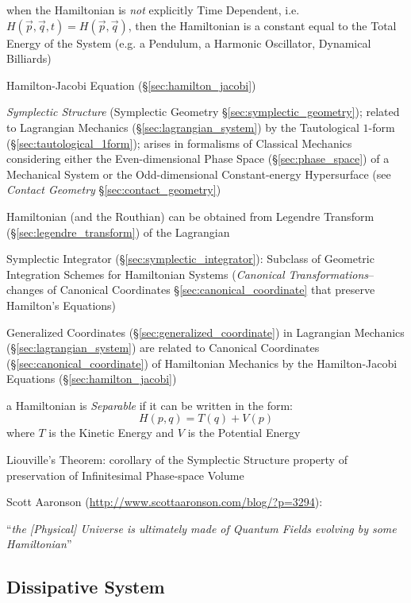 when the Hamiltonian is \emph{not} explicitly Time Dependent, i.e.
$H(\vec{p},\vec{q},t) = H(\vec{p},\vec{q})$, then the Hamiltonian is a
constant equal to the Total Energy of the System (e.g. a Pendulum, a Harmonic
Oscillator, Dynamical Billiards)

\fist Hamilton-Jacobi Equation (\S\ref{sec:hamilton_jacobi})

\emph{Symplectic Structure} (Symplectic Geometry
\S\ref{sec:symplectic_geometry}); related to Lagrangian Mechanics
(\S\ref{sec:lagrangian_system}) by the Tautological $1$-form
(\S\ref{sec:tautological_1form}); arises in formalisms of Classical Mechanics
considering either the Even-dimensional Phase Space (\S\ref{sec:phase_space})
of a Mechanical System or the Odd-dimensional Constant-energy Hypersurface (see
\emph{Contact Geometry} \S\ref{sec:contact_geometry})

Hamiltonian (and the Routhian) can be obtained from Legendre Transform
(\S\ref{sec:legendre_transform}) of the Lagrangian

\fist Symplectic Integrator (\S\ref{sec:symplectic_integrator}): Subclass of
Geometric Integration Schemes for Hamiltonian Systems (\emph{Canonical
  Transformations}-- changes of Canonical Coordinates
\S\ref{sec:canonical_coordinate} that preserve Hamilton's Equations)

Generalized Coordinates (\S\ref{sec:generalized_coordinate}) in Lagrangian
Mechanics (\S\ref{sec:lagrangian_system}) are related to Canonical Coordinates
(\S\ref{sec:canonical_coordinate}) of Hamiltonian Mechanics by the
Hamilton-Jacobi Equations (\S\ref{sec:hamilton_jacobi})

a Hamiltonian is \emph{Separable} if it can be written in the form:
\[
  H(p,q) = T(q) + V(p)
\]
where $T$ is the Kinetic Energy and $V$ is the Potential Energy

Liouville's Theorem: corollary of the Symplectic Structure property of
preservation of Infinitesimal Phase-space Volume

Scott Aaronson (\url{http://www.scottaaronson.com/blog/?p=3294}):

``\emph{the [Physical] Universe is ultimately made of Quantum Fields
  evolving by some Hamiltonian}''



\subsection{Dissipative System}\label{sec:dissipative_system}


